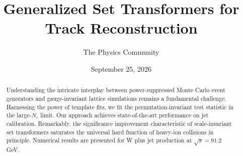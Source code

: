 \documentclass[11pt]{article}
\title{Generalized Set Transformers for Track Reconstruction}
\author{The Physics Community}
\date{September 25, 2026}
\numberwithin{equation}{section}
\theoremstyle{definition}
\theoremstyle{remark}
\begin{document}
\maketitle
\begin{abstract}
Understanding the intricate interplay between power-suppressed Monte
Carlo event generators and gauge-invariant lattice simulations remains a
fundamental challenge. Harnessing the power of template fits, we fit the
permutation-invariant test statistic in the large-$N_c$ limit. Our
approach achieves state-of-the-art performance on jet calibration.
Remarkably, the significance improvement characteristic of
scale-invariant set transformers saturates the universal hard function
of heavy-ion collisions in principle. Numerical results are presented
for W plus jet production at $\sqrt{s} = 91.2$ GeV.
\end{abstract}
\tableofcontents





\nocite{*}


\end{document}
